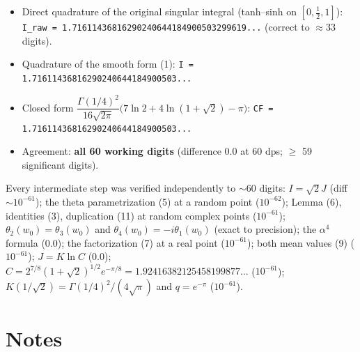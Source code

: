 \documentclass[11pt]{article}
\theoremstyle{remark}
\begin{document}
\begin{itemize}
\item Direct quadrature of the original singular integral (tanh--sinh on $[0,\tfrac12,1]$):
\texttt{I\_raw = 1.71611436816290240644184900503299619...} (correct to $\approx33$ digits).
\item Quadrature of the smooth form (1):
\texttt{I = 1.71611436816290240644184900503...}
\item Closed form $\dfrac{\Gamma(1/4)^2}{16\sqrt{2\pi}}\bigl(7\ln2+4\ln(1+\sqrt2)-\pi\bigr)$:
\texttt{CF = 1.71611436816290240644184900503...}
\item Agreement: \textbf{all 60 working digits} (difference $0.0$ at 60 dps; $\ge$ 59 significant digits).
\end{itemize}

Every intermediate step was verified independently to $\sim60$ digits:
$I=\sqrt2 J$ (diff $\sim10^{-61}$); the theta parametrization (5) at a random point ($10^{-62}$); Lemma (6), identities (3), duplication (11) at random complex points ($10^{-61}$); $\theta_2(w_0)=\theta_3(w_0)$ and $\theta_4(w_0)=-i\theta_1(w_0)$ (exact to precision); the $\alpha^4$ formula ($0.0$); the factorization (7) at a real point ($10^{-61}$); both mean values (9) ($10^{-61}$); $J=K\ln C$ ($0.0$); $C=2^{7/8}(1+\sqrt2)^{1/2}e^{-\pi/8}=1.92416382125458199877\ldots$ ($10^{-61}$); $K(1/\sqrt2)=\Gamma(1/4)^2/(4\sqrt\pi)$ and $q=e^{-\pi}$ ($10^{-61}$).

\section*{Notes}
\end{document}
